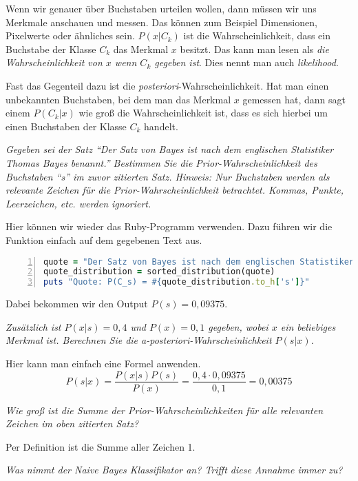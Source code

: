 \documentclass[
  ngerman,
  DIV=14
]{scrartcl}
\begin{document}
Wenn wir genauer über Buchstaben urteilen wollen, dann müssen wir uns Merkmale anschauen und messen. Das können zum Beispiel Dimensionen, Pixelwerte oder ähnliches sein. $P(x|C_k)$ ist die Wahrscheinlichkeit, dass ein Buchstabe der Klasse $C_k$ das Merkmal $x$ besitzt. Das kann man lesen als \emph{die Wahrscheinlichkeit von $x$ wenn $C_k$ gegeben ist}. Dies nennt man auch \emph{likelihood}.

Fast das Gegenteil dazu ist die \emph{posteriori}-Wahrscheinlichkeit. Hat man einen unbekannten Buchstaben, bei dem man das Merkmal $x$ gemessen hat, dann sagt einem $P(C_k|x)$ wie groß die Wahrscheinlichkeit ist, dass es sich hierbei um einen Buchstaben der Klasse $C_k$ handelt.

\bigskip\noindent
\emph{Gegeben sei der Satz \enquote{Der Satz von Bayes ist nach dem englischen Statistiker Thomas Bayes benannt.} Bestimmen Sie die Prior-Wahrscheinlichkeit des Buchstaben \enquote{s} im zuvor zitierten Satz. Hinweis: Nur Buchstaben werden als relevante Zeichen für die Prior-Wahrscheinlichkeit betrachtet. Kommas, Punkte, Leerzeichen, etc. werden ignoriert.}

Hier können wir wieder das Ruby-Programm verwenden. Dazu führen wir die Funktion einfach auf dem gegebenen Text aus.
\begin{lstlisting}[language=ruby,numbers=left]
quote = "Der Satz von Bayes ist nach dem englischen Statistiker Thomas Bayes benannt."
quote_distribution = sorted_distribution(quote)
puts "Quote: P(C_s) = #{quote_distribution.to_h['s']}"
\end{lstlisting}
Dabei bekommen wir den Output $P(s) = 0,09375$.

\medskip\noindent
\emph{Zusätzlich ist $P(x|s) = 0,4$ und $P(x) = 0,1$ gegeben, wobei $x$ ein beliebiges Merkmal ist. Berechnen Sie die a-posteriori-Wahrscheinlichkeit $P(s|x)$.}

Hier kann man einfach eine Formel anwenden.
\begin{equation*}
P(s|x) = \frac{P(x|s)P(s)}{P(x)} = \frac{0,4 \cdot 0,09375}{0,1} = 0,00375
\end{equation*}

\medskip\noindent
\emph{Wie groß ist die Summe der Prior-Wahrscheinlichkeiten für alle relevanten Zeichen im oben zitierten Satz?}

Per Definition ist die Summe aller Zeichen 1. 

\medskip\noindent
\emph{Was nimmt der Naive Bayes Klassifikator an? Trifft diese Annahme immer zu?}
\end{document}
